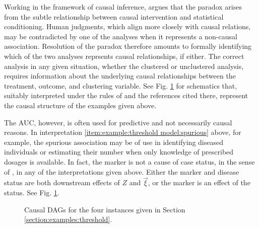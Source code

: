 \documentclass[12pt]{article}
\begin{document}
Working in the framework of causal inference, \cite{pearl2014} argues
that the paradox arises from the subtle relationship between
causal intervention and statistical conditioning. Human judgments, which align more closely with causal relations, may be contradicted by one of the analyses when it represents a non-causal association. Resolution of the paradox therefore amounts to
formally identifying which of the two analyses reprsents causal relationships, if either. The correct analysis
in any given situation, whether the clustered or unclustered analysis,
requires information about the underlying causal relationships between
the treatment, outcome, and clustering variable. See Fig. \ref{fig:dags} for schematics that, suitably interpreted under the rules of \cite{pearl2014} and the references cited there, represent the causal structure of the examples given above.

The AUC, however, is often used for predictive and not necessarily causal reasons. In interpretation \ref{item:example:threshold model:spurious} above, for example, the spurious association may be of use in identifying diseased individuals or estimating their number when only knowledge of prescribed dosages is available. In fact, the marker is not a cause of case status, in the sense of \cite{pearl2014}, in any of the interpretations given above. Either the marker and disease status are both downstream effects of $Z$ and $\vec{\xi}$, or the marker is an effect of the status. See Fig. \ref{fig:dags}.

\begin{figure}
\caption{Causal DAGs for the four instances given in Section \ref{section:examples:threshold}.}\label{fig:dags}
\end{figure}
\end{document}

